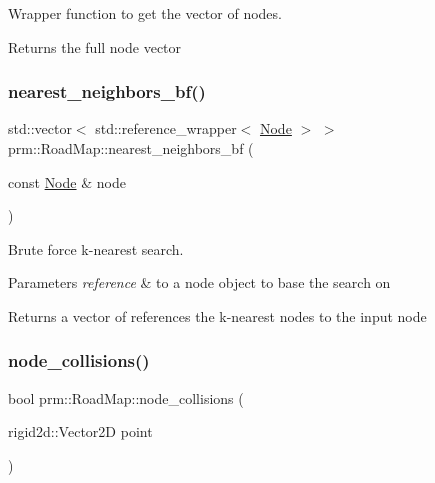 Wrapper function to get the vector of nodes. 

\begin{DoxyReturn}{Returns}
the full node vector 
\end{DoxyReturn}
\mbox{\label{classprm_1_1RoadMap_a88e8d2df6c41bdc5ee5df4debbd0324d}} 
\subsubsection{\texorpdfstring{nearest\+\_\+neighbors\+\_\+bf()}{nearest\_neighbors\_bf()}}
{\footnotesize\ttfamily std\+::vector$<$ std\+::reference\+\_\+wrapper$<$ \hyperlink{structprm_1_1Node}{Node} $>$ $>$ prm\+::\+Road\+Map\+::nearest\+\_\+neighbors\+\_\+bf (\begin{DoxyParamCaption}\item[{const \hyperlink{structprm_1_1Node}{Node} \&}]{node }\end{DoxyParamCaption})\hspace{0.3cm}{\ttfamily [private]}}



Brute force k-\/nearest search. 


\begin{DoxyParams}{Parameters}
{\em reference} & to a node object to base the search on \\
\hline
\end{DoxyParams}
\begin{DoxyReturn}{Returns}
a vector of references the k-\/nearest nodes to the input node 
\end{DoxyReturn}
\mbox{\label{classprm_1_1RoadMap_a73c24a16d78040b0d5f247f0cf181363}} 
\subsubsection{\texorpdfstring{node\+\_\+collisions()}{node\_collisions()}}
{\footnotesize\ttfamily bool prm\+::\+Road\+Map\+::node\+\_\+collisions (\begin{DoxyParamCaption}\item[{rigid2d\+::\+Vector2D}]{point }\end{DoxyParamCaption})\hspace{0.3cm}{\ttfamily [private]}}



